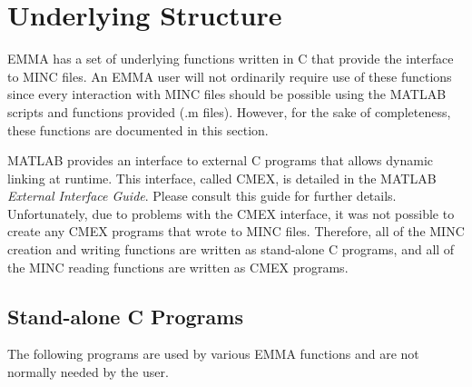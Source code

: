 \newpage
\section{Underlying Structure}

EMMA has a set of underlying functions written in C that provide the
interface to MINC files.  An EMMA user will not ordinarily require
use of these functions since every interaction with MINC files should
be possible using the MATLAB scripts and functions provided (.m
files).  However, for the sake of completeness, these functions are
documented in this section.

MATLAB provides an interface to external C programs that allows
dynamic linking at runtime.  This interface, called CMEX, is detailed
in the MATLAB {\em External Interface Guide}.  Please consult this
guide for further details.  Unfortunately, due to problems with the
CMEX interface, it was not possible to create any CMEX programs that
wrote to MINC files.  Therefore, all of the MINC creation and writing
functions are written as stand-alone C programs, and all of the MINC
reading functions are written as CMEX programs.


\subsection {Stand-alone C Programs}

The following programs are used by various EMMA functions and are not
normally needed by the user.

